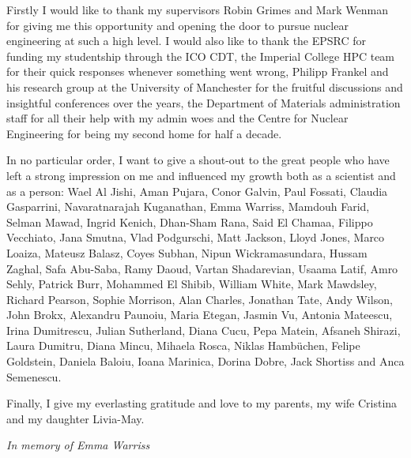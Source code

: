 \cleardoublepage


\begin{acknowledgements}

Firstly I would like to thank my supervisors Robin Grimes and Mark Wenman for giving me this opportunity and opening the door to pursue nuclear engineering at such a high level. I would also like to thank the EPSRC for funding my studentship through the ICO CDT, the Imperial College HPC team for their quick responses whenever something went wrong, Philipp Frankel and his research group at the University of Manchester for the fruitful discussions and insightful conferences over the years, the Department of Materials administration staff for all their help with my admin woes and the Centre for Nuclear Engineering for being my second home for half a decade.

In no particular order, I want to give a shout-out to the great people who have left a strong impression on me and influenced my growth both as a scientist and as a person: Wael Al Jishi, Aman Pujara, Conor Galvin, Paul Fossati, Claudia Gasparrini, Navaratnarajah Kuganathan, Emma Warriss, Mamdouh Farid, Selman Mawad, Ingrid Kenich, Dhan-Sham Rana, Said El Chamaa, Filippo Vecchiato, Jana Smutna, Vlad Podgurschi, Matt Jackson, Lloyd Jones, Marco Loaiza, Mateusz Balasz, Coyes Subhan, Nipun Wickramasundara, Hussam Zaghal, Safa Abu-Saba, Ramy Daoud, Vartan Shadarevian, Usaama Latif, Amro Sehly, Patrick Burr, Mohammed El Shibib, William White, Mark Mawdsley, Richard Pearson, Sophie Morrison, Alan Charles, Jonathan Tate, Andy Wilson, John Brokx, Alexandru Paunoiu, Maria Etegan, Jasmin Vu, Antonia Mateescu, Irina Dumitrescu, Julian Sutherland, Diana Cucu, Pepa Matein, Afsaneh Shirazi, Laura Dumitru, Diana Mincu, Mihaela Rosca, Niklas Hamb\"{u}chen, Felipe Goldstein, Daniela Baloiu, Ioana Marinica, Dorina Dobre, Jack Shortiss and Anca Semenescu. 

Finally, I give my everlasting gratitude and love to my parents, my wife Cristina and my daughter Livia-May.

\clearpage

\begin{center}
\emph{In memory of Emma Warriss}
\end{center}

\end{acknowledgements}